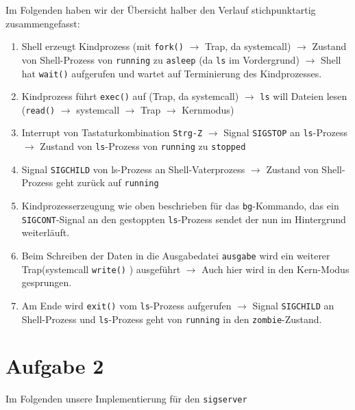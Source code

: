 \documentclass{ti2}
\begin{document}
Im Folgenden haben wir der Übersicht halber den Verlauf stichpunktartig zusammengefasst:
\begin{enumerate}
\item Shell erzeugt Kindprozess (mit \texttt{fork()} $\rightarrow$ Trap, da systemcall)  $\rightarrow$ Zustand von Shell-Prozess von \texttt{running} zu \texttt{asleep} (da \texttt{ls} im Vordergrund)
	$\rightarrow$ Shell hat \texttt{wait()} aufgerufen und wartet auf Terminierung des Kindprozesses.

\item Kindprozess führt \texttt{exec()} auf (Trap, da systemcall) $\rightarrow$ \texttt{ls} will Dateien lesen (\texttt{read()} $\rightarrow$ systemcall $\rightarrow$ Trap $\rightarrow$ Kernmodus)

\item Interrupt von Tastaturkombination \texttt{Strg-Z} $\rightarrow$ Signal \texttt{SIGSTOP} an \texttt{ls}-Prozess $\rightarrow$ Zustand von \texttt{ls}-Prozess von \texttt{running} zu \texttt{stopped}

\item Signal \texttt{SIGCHILD} von ls-Prozess an Shell-Vaterprozess $\rightarrow$ Zustand von Shell-Prozess geht zurück auf \texttt{running}

\item Kindprozesserzeugung wie oben beschrieben für das \texttt{bg}-Kommando, das ein \texttt{SIGCONT}-Signal an den gestoppten \texttt{ls}-Prozess sendet der nun im Hintergrund weiterläuft. 

\item Beim Schreiben der Daten in die Ausgabedatei \texttt{ausgabe} wird ein weiterer Trap(systemcall \texttt{write()} )  ausgeführt
	$\rightarrow$ Auch hier wird in den Kern-Modus gesprungen. 

\item Am Ende wird \texttt{exit()} vom \texttt{ls}-Prozess aufgerufen $\rightarrow$ Signal \texttt{SIGCHILD} an Shell-Prozess und \texttt{ls}-Prozess geht von \texttt{running}  in den \texttt{zombie}-Zustand.
\end{enumerate}

\section*{Aufgabe 2}

Im Folgenden unsere Implementierung für den \texttt{sigserver}


\end{document}
